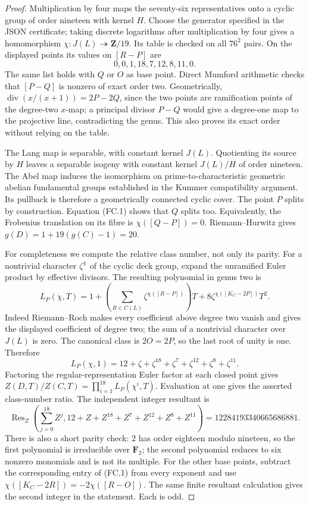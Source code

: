 \begin{proof}
Multiplication by four maps the seventy-six representatives onto a
cyclic group of order nineteen with kernel $H$. Choose the generator
specified in the JSON certificate; taking discrete logarithms after
multiplication by four gives a homomorphism
$\chi:J(L)\twoheadrightarrow\mathbf Z/19$. Its table is checked on
all $76^2$ pairs. On the displayed points its values on $[R-P]$ are
\[
       0, 0, 1, 18, 7, 12, 8, 11, 0.                 \tag{FC.1}
\]
The same list holds with $Q$ or $O$ as base point. Direct Mumford
arithmetic checks that $[P-Q]$ is nonzero of exact order two.
Geometrically, $\operatorname{div}(x/(x+1))=2P-2Q$, since the two
points are ramification points of the degree-two $x$-map; a principal
divisor $P-Q$ would give a degree-one map to the projective line,
contradicting the genus. This also proves its exact order without
relying on the table.

The Lang map is separable, with constant kernel $J(L)$. Quotienting its
source by $H$ leaves a separable isogeny with constant kernel
$J(L)/H$ of order nineteen. The Abel map induces the isomorphism on
prime-to-characteristic geometric abelian fundamental groups established
in the Kummer compatibility argument. Its pullback is therefore a
geometrically connected cyclic cover. The point $P$ splits by
construction. Equation (FC.1) shows that $Q$ splits too. Equivalently,
the Frobenius translation on its fibre is $\chi([Q-P])=0$.
Riemann--Hurwitz gives $g(D)=1+19(g(C)-1)=20$.

For completeness we compute the relative class number, not only its
parity. For a nontrivial character $\zeta^\chi$ of the cyclic deck
group, expand the unramified Euler product by effective divisors.
The resulting polynomial in genus two is
\[
 L_P(\chi,T)=1+
   \left(\sum_{R\in C(L)}\zeta^{\chi([R-P])}\right)T
       +8\zeta^{\chi([K_C-2P])}T^2.
\]
Indeed Riemann--Roch makes every coefficient above degree two vanish
and gives the displayed coefficient of degree two; the sum of a
nontrivial character over $J(L)$ is zero. The canonical class is
$2O=2P$, so the last root of unity is one. Therefore
\[
 L_P(\chi,1)=12+\zeta+\zeta^{18}+\zeta^7+
                      \zeta^{12}+\zeta^8+\zeta^{11}.
\]
Factoring the regular-representation Euler factor at each closed point
gives $Z(D,T)/Z(C,T)=\prod_{i=1}^{18}L_P(\chi^i,T)$. Evaluation at
one gives the asserted class-number ratio. The independent integer
resultant is
\[
 \operatorname{Res}_Z\left(\sum_{j=0}^{18}Z^j,
      12+Z+Z^{18}+Z^7+Z^{12}+Z^8+Z^{11}\right)
           =12284193340665686881.
\]
There is also a short parity check: $2$ has order eighteen modulo
nineteen, so the first polynomial is irreducible over $\mathbf F _2$;
the second polynomial reduces to six nonzero monomials and is not
its multiple. For the other base points, subtract the corresponding
entry of (FC.1) from every exponent and use
$\chi([K_C-2R])=-2\chi([R-O])$. The same finite resultant calculation
gives the second integer in the statement. Each is odd.


\end{proof}
